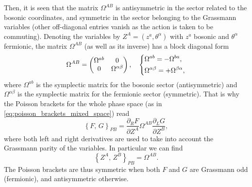 Then, it is seen that the matrix \(\Omega^{AB}\) is antisymmetric in the sector related to the bosonic coordinates, and symmetric in the sector belonging to the Grassmann variables (other off-diagonal entries vanish as the action is taken to be commuting). Denoting the variables by \(Z^A = (z^a, \theta^{\alpha})\) with \(z^a\) bosonic and \(\theta^{\alpha}\) fermionic, the matrix \(\Omega^{AB}\) (as well as its inverse) has a block diagonal form
\begin{equation}
    \Omega^{AB} = \begin{pmatrix}
        \Omega^{ab} & 0                    \\
        0           & \Omega^{\alpha\beta}
    \end{pmatrix}, \quad \begin{dcases}
        \Omega^{ab} = - \Omega^{ba}, \\
        \Omega^{\alpha\beta} = + \Omega^{\beta\alpha},
    \end{dcases}
    \label{eq:symplectic_matrix_block_diagonal}
\end{equation}
where \(\Omega^{ab}\) is the symplectic matrix for the bosonic sector (antisymmetric) and \(\Omega^{\alpha\beta}\) is the symplectic matrix for the fermionic sector (symmetric). That is why the Poisson brackets for the whole phase space (as in \eqref{eq:poisson_brackets_mixed_space}) read
\[
    \left\{ F,\,G \right\}_{PB} = \frac{\partial_R F}{\partial Z^A} \Omega^{AB} \frac{\partial_L G}{\partial Z^B},
\]
where both left and right derivatives are used to take into account the Grassmann parity of the variables. In particular we can find
\[
    \left\{Z^A,\,Z^B\right\}_{PB} = \Omega^{AB}.
\]
The Poisson brackets are thus symmetric when both \(F\) and \(G\) are Grassmann odd (fermionic), and antisymmetric otherwise.

